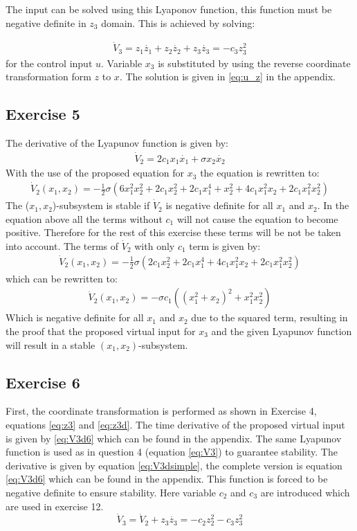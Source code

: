 \documentclass[a4paper,12pt]{article}
\begin{document}
The input can be solved using this Lyaponov function, this function must be negative definite in $z_3$ domain. This is achieved by solving:

\begin{align}
\dot{V}_3=z_1\dot{z_1}+z_2\dot{z_2}+z_3 \dot{z_3} = -c_3z_3^2
\label{eq:V3d}
\end{align}
for the control input $u$. Variable $x_3$ is substituted by using the reverse coordinate transformation form $z$ to $x$. The solution is given in \ref{eq:u_z} in the appendix.

\subsection{Exercise 5} %
The derivative of the Lyapunov function is given by:
\begin{align}
\dot{V}_2 = 2c_1x_1\dot{x_1}+\sigma x_2\dot{x_2}
\end{align}
With the use of the proposed equation for $x_3$ the equation is rewritten to:
\begin{align}
\dot{V}_2(x_1,x_2)=-\frac{1}{2}\sigma(6x_1^2x_2^2+2c_1x_2^2+2c_1x_1^4+x_2^2+4c_1x_1^2x_2+2c_1x_1^2x_2^2)
\end{align}
The ($x_1,x_2$)-subsystem is stable if $\dot{V}_2$ is negative definite for all $x_1$ and $x_2$. In the equation above all the terms without $c_1$ will not cause the equation to become positive. Therefore for the rest of this exercise these terms will be not be taken into account. The terms of $\dot{V}_2$ with only $c_1$ term is given by:
\begin{align}
\dot{V}_{2}(x_1,x_2)=-\frac{1}{2}\sigma(2c_1x_2^2+2c_1x_1^4+4c_1x_1^2x_2+2c_1x_1^2x_2^2)
\end{align}
which can be rewritten to:
\begin{align}
\dot{V}_{2}(x_1,x_2)=-\sigma c_1((x_1^2+x_2)^2+x_1^2x_2^2)
\end{align}
Which is negative definite for all $x_1$ and $x_2$ due to the squared term, resulting in the proof that the proposed virtual input for $x_3$ and the given Lyapunov function will result in a stable $(x_1 , x_2)$-subsystem.

\subsection{Exercise 6} %
First, the coordinate transformation is performed as shown in Exercise 4, equations \ref{eq:z3} and \ref{eq:z3d}. The time derivative of the proposed virtual input is given by \ref{eq:V3d6} which can be found in the appendix. The same Lyapunov function is used as in question 4 (equation \ref{eq:V3}) to guarantee stability. The derivative is given by equation \ref{eq:V3dsimple}, the complete version is equation \ref{eq:V3d6} which can be found in the appendix. This function is forced to be negative definite to ensure stability. Here variable $c_2$ and $c_3$ are introduced which are used in exercise 12.
\begin{equation}
\dot{V}_3 = \dot{V}_2 + z_3\dot{z_3} = -c_2z_2^2-c_3z_3^2
\label{eq:V3dsimple}
\end{equation}
\end{document}

